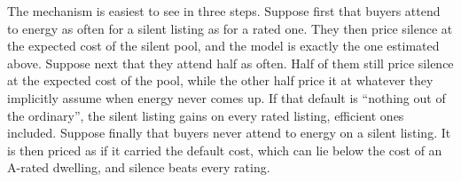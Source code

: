 The mechanism is easiest to see in three steps. Suppose first that buyers attend to energy as often for a silent listing as for a rated one. They then price silence at the expected cost of the silent pool, and the model is exactly the one estimated above. Suppose next that they attend half as often. Half of them still price silence at the expected cost of the pool, while the other half price it at whatever they implicitly assume when energy never comes up. If that default is ``nothing out of the ordinary'', the silent listing gains on every rated listing, efficient ones included. Suppose finally that buyers never attend to energy on a silent listing. It is then priced as if it carried the default cost, which can lie below the cost of an A-rated dwelling, and silence beats every rating.
